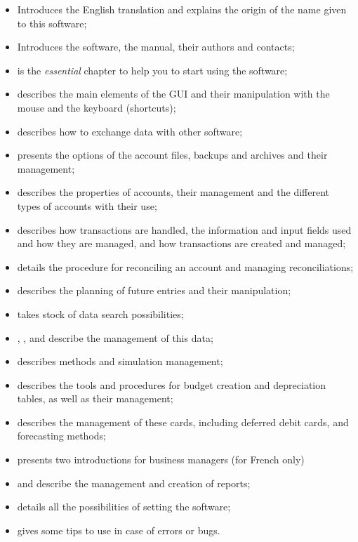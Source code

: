 \begin{itemize}
	\item {} Introduces the English translation and explains the origin of the name given to this software;
	\item {} Introduces the software, the manual, their authors and contacts;
	\item {} is the \emph{essential} chapter to help you to start using the software;
	\item {} describes the main elements of the GUI and their manipulation with the mouse and the keyboard (shortcuts);
	\item {} describes how to exchange data with other software;
	\item {} presents the options of the account files, backups and archives and their management;
	\item {} describes the properties of accounts, their management and the different types of accounts with their use;
	\item {}  describes how transactions are handled, the information and input fields used and how they are managed, and how transactions are created and managed;
	\item {} details the procedure for reconciling an account and managing reconciliations;
	\item {} describes the planning of future entries and their manipulation;
	\item {} takes stock of data search possibilities;
	\item {}, ,  and  describe the management of this data;
	\item {} describes methods and simulation management;
	\item {} describes the tools and procedures for budget creation and depreciation tables, as well as their management;
	\item {} describes the management of these cards, including deferred debit cards, and forecasting methods;
	\item {} presents two introductions for business managers (for French only)
	\item {} and  describe the management and creation of reports;
	\item {} details all the possibilities of setting the software;
	\item {} gives some tips to use in case of errors or bugs.
\end{itemize}

